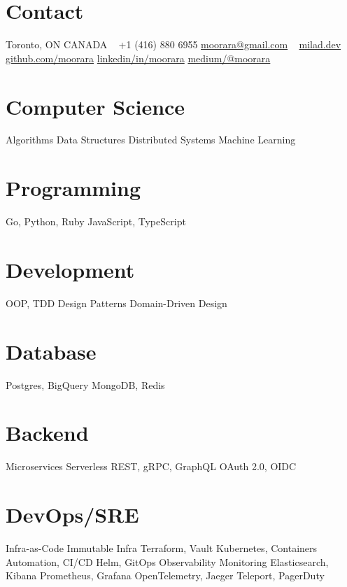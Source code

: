 \documentclass[]{cv-style}                     %
\begin{document}
\lastupdated



\begin{aside}
%
\section{Contact}
Toronto, ON  CANADA
~
+1 (416) 880 6955
\href{mailto:moorara@gmail.com}{moorara@gmail.com}
~
\href{https://milad.dev}{milad.dev}
\href{https://github.com/moorara}{github.com/moorara}
\href{https://linkedin.com/in/moorara}{linkedin/in/moorara}
\href{https://medium.com/@moorara}{medium/@moorara}
%
\section{Computer Science}
Algorithms
Data Structures
Distributed Systems
Machine Learning
%
\section{Programming}
Go, Python, Ruby
JavaScript, TypeScript
%
\section{Development}
OOP, TDD
Design Patterns
Domain-Driven Design
%
\section{Database}
Postgres, BigQuery
MongoDB, Redis
%
\section{Backend}
Microservices
Serverless
REST, gRPC, GraphQL
OAuth 2.0, OIDC
%
%
\section{DevOps/SRE}
Infra-as-Code
Immutable Infra
Terraform, Vault
Kubernetes, Containers
Automation, CI/CD
Helm, GitOps
Observability
Monitoring
Elasticsearch, Kibana
Prometheus, Grafana
OpenTelemetry, Jaeger
Teleport, PagerDuty
%

\end{aside}
\end{document}

